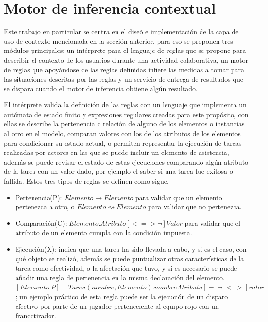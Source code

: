 \section{Motor de inferencia contextual}

Este trabajo en particular se centra en el dise\~o e implementaci\'on de la capa de uso de contexto mencionada en la secci\'on anterior, para eso se proponen tres m\'odulos principales: un int\'erprete para el lenguaje de reglas que se propone para describir el contexto de los usuarios durante una actividad colaborativa, un motor de reglas que apoy\'andose de las reglas definidas infiere las medidas a tomar para las situaciones descritas por las reglas y un servicio de entrega de resultados que se dispara cuando el motor de inferencia obtiene alg\'un resultado.

El int\'erprete valida la definici\'on de las reglas con un lenguaje que implementa un aut\'omata de estado finito y expresiones regulares creadas para este prop\'osito, con ellas se describe la pertenencia o relaci\'on de alguno de los elementos o instancias al otro en el modelo, comparan valores con los de los atributos de los elementos para condicionar su estado actual, o permiten representar la ejecuci\'on de tareas realizadas por actores en las que se puede incluir un elemento de asistencia, adem\'as se puede revisar el estado de estas ejecuciones comparando alg\'un atributo de la tarea con un valor dado, por ejemplo el saber si una tarea fue exitosa o fallida. Estos tres tipos de reglas se definen como sigue.

\begin{itemize}
\item Pertenencia(P): $Elemento \rightarrow Elemento$ para validar que un elemento pertenezca a otro, o $Elemento \rightsquigarrow Elemento$ para validar que no pertenezca.

\item Comparaci\'on(C): $ Elemento.Atributo[<=>¬]Valor $ para validar que el atributo de un elemento cumpla con la condici\'on impuesta.

\item Ejecuci\'on(X): indica que una tarea ha sido llevada a cabo, y si es el caso, con qu\'e objeto se realiz\'o, adem\'as se puede puntualizar otras caracter\'isticas de la tarea como efectividad, o la afectaci\'on que tuvo, y si es necesario se puede a\~nadir una regla de pertenencia en la misma declaraci\'on del elemento.  $ [Elemento | P] - Tarea(nombre, Elemento).nombreAtributo [ = | \neg | < | > ] valor $; un ejemplo pr\'actico de esta regla puede ser la ejecuci\'on de un disparo efectivo por parte de un jugador perteneciente al equipo rojo con un francotirador.
\end{itemize}

